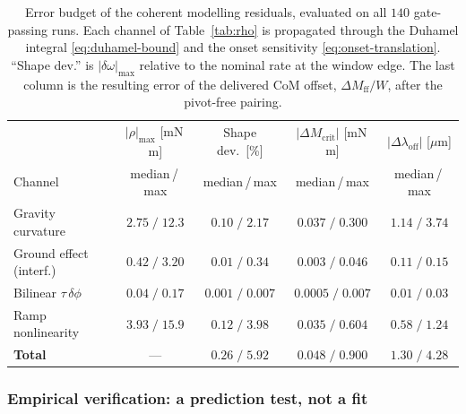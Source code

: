 \begin{table}[t]
\centering
\caption{Error budget of the coherent modelling residuals, evaluated on
all $140$ gate-passing runs. Each channel of Table~\ref{tab:rho} is
propagated through the Duhamel integral \eqref{eq:duhamel-bound} and the
onset sensitivity \eqref{eq:onset-translation}. ``Shape dev.'' is
$|\delta\omega|_{\max}$ relative to the nominal rate at the window edge.
The last column is the resulting error of the delivered CoM offset,
$\Delta M_{\mathrm{ff}}/W$, after the pivot-free pairing.}
\label{tab:budget}
\small
\setlength{\tabcolsep}{5pt}
\renewcommand{\arraystretch}{1.15}
\begin{tabular}{@{}lcccc@{}}
\hline
& $|\rho|_{\max}$ [mN\,m] & Shape dev.\ [\%]
& $|\Delta M_{\mathrm{crit}}|$ [mN\,m] & $|\Delta\lambda_{\mathrm{off}}|$
[$\mu$m] \\
Channel & median\,/\,max & median\,/\,max & median\,/\,max &
median\,/\,max \\
\hline
Gravity curvature      & $2.75\;/\;12.3$ & $0.10\;/\;2.17$
                       & $0.037\;/\;0.300$ & $1.14\;/\;3.74$ \\
Ground effect (interf.)& $0.42\;/\;3.20$ & $0.01\;/\;0.34$
                       & $0.003\;/\;0.046$ & $0.11\;/\;0.15$ \\
Bilinear $\tau\,\delta\phi$ & $0.04\;/\;0.17$ & $0.001\;/\;0.007$
                       & $0.0005\;/\;0.007$ & $0.01\;/\;0.03$ \\
Ramp nonlinearity      & $3.93\;/\;15.9$ & $0.12\;/\;3.98$
                       & $0.035\;/\;0.604$ & $0.58\;/\;1.24$ \\
\hline
\textbf{Total}         & --- & $0.26\;/\;5.92$
                       & $0.048\;/\;0.900$ &
                         $\mathbf{1.30\;/\;4.28}$ \\
\hline
\end{tabular}
\end{table}

\subsubsection{Empirical verification: a prediction test, not a fit}
\label{sec:fid-verify}

